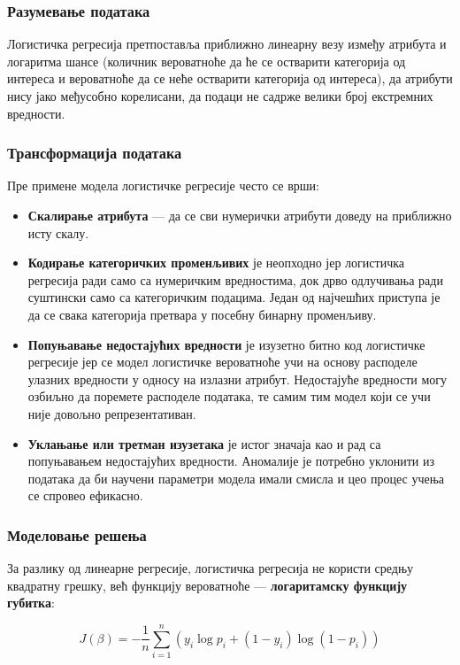 \subsubsection{Разумевање података}
Логистичка регресија претпоставља приближно линеарну везу између атрибута и логаритма шансе (количник вероватноће да ће се остварити категорија од интереса и вероватноће да се неће остварити категорија од интереса), да атрибути нису јако међусобно корелисани, да подаци не садрже велики број екстремних вредности.

\subsubsection{Трансформација података}
Пре примене модела логистичке регресије често се врши:

\begin{itemize}
  \item \textbf{Скалирање атрибута} — да се сви нумерички атрибути доведу на приближно исту скалу.
  \item \textbf{Кодирање категоричких променљивих} је неопходно јер логистичка регресија ради само са нумеричким вредностима, док дрво одлучивања ради суштински само са категоричким подацима. Један од најчешћих приступа је да се свака категорија претвара у посебну бинарну променљиву.
  \item \textbf{Попуњавање недостајућих вредности} је изузетно битно код логистичке регресије јер се модел логистичке вероватноће учи на основу расподеле улазних вредности у односу на излазни атрибут. Недостајуће вредности могу озбиљно да поремете расподеле података, те самим тим модел који се учи није довољно репрезентативан.
  \item \textbf{Уклањање или третман изузетака} је истог значаја као и рад са попуњавањем недостајућих вредности. Аномалије је потребно уклонити из података да би научени параметри модела имали смисла и цео процес учења се спровео ефикасно.
\end{itemize}

\subsubsection{Моделовање решења}
За разлику од линеарне регресије, логистичка регресија не користи средњу квадратну грешку, већ функцију вероватноће — \textbf{логаритамску функцију губитка}:

\[
J(\beta) = -\frac{1}{n} \sum_{i=1}^{n} \left( y_{i} \log p_{i} + (1 - y_{i}) \log (1 - p_{i}) \right)
\]

